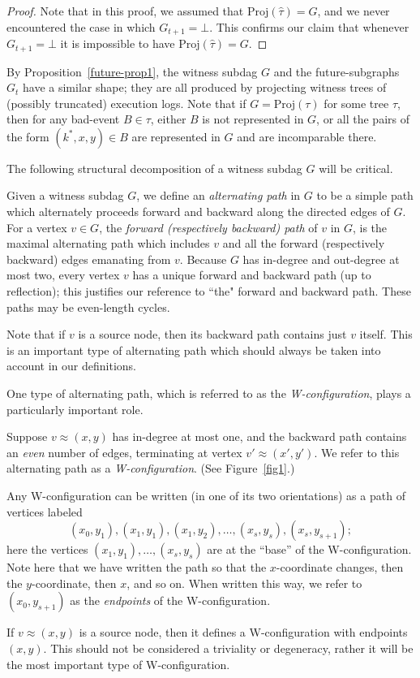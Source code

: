 \begin{proof}
Note that in this proof, we assumed that $\text{Proj}(\hat \tau) = G$, and we never encountered the case in which $G_{t+1} = \bot$. This confirms our claim that whenever $G_{t+1} = \bot$ it is impossible to have $\text{Proj}(\hat \tau) = G$.
\end{proof}

By Proposition~\ref{future-prop1}, the witness subdag $G$ and the future-subgraphs $G_t$ have a similar shape; they are all produced by projecting witness trees of (possibly truncated) execution logs. Note that if $G = \text{Proj}(\tau)$ for some tree $\tau$, then for any bad-event $B \in \tau$, either $B$ is not represented in $G$, or all the pairs of the form $(k^*, x, y) \in B$ are represented in $G$ and are incomparable there.

The following structural decomposition of a witness subdag $G$ will be critical.
\begin{definition} Given a witness subdag $G$, we define an \emph{alternating path} in $G$ to be a simple path which alternately proceeds forward and backward along the directed edges of $G$. For a vertex $v \in G$, the \emph{forward (respectively backward) path} of $v$ in $G$, is the maximal alternating path which includes $v$ and all the forward (respectively backward) edges emanating from $v$. Because $G$ has in-degree and out-degree at most two, every vertex $v$ has a unique forward and backward path (up to reflection); this justifies our reference to ``the" forward and backward path. These paths may be even-length cycles.

Note that if $v$ is a source node, then its backward path contains just $v$ itself. This is an important type of alternating path which should always be taken into account in our definitions.
\end{definition}

One type of alternating path, which is referred to as the \emph{W-configuration}, plays a particularly important role.

\begin{definition}
Suppose $v \approx (x, y)$ has in-degree at most one, and the backward path contains an \emph{even} number of edges, terminating at vertex $v' \approx (x', y')$. We refer to this alternating path as a \emph{W-configuration}. (See Figure~\ref{fig1}.)

Any W-configuration can be written (in one of its two orientations) as a path of vertices labeled $$
(x_0, y_1), (x_1, y_1), (x_1, y_2), \dots, (x_s, y_s), (x_s, y_{s+1});
$$ here the vertices $(x_1, y_1), \dots, (x_s, y_s)$ are at the ``base'' of the W-configuration. Note here that we have written the path so that the $x$-coordinate changes, then the $y$-coordinate, then $x$, and so on. When written this way, we refer to $(x_0, y_{s+1})$ as the \emph{endpoints} of the W-configuration.

If $v \approx (x,y)$ is a source node, then it defines a W-configuration with endpoints $(x,y)$. This should not be considered a triviality or degeneracy, rather it will be the most important type of W-configuration.
\end{definition}

